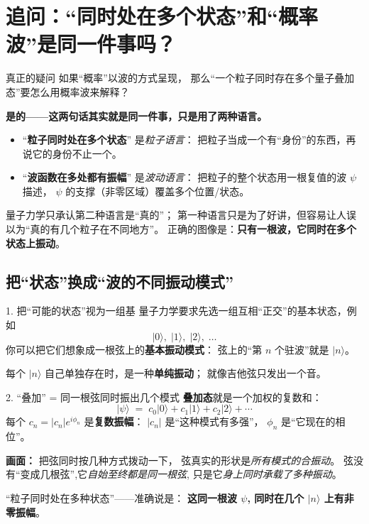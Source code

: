 \documentclass[11pt,a4paper]{ctexart}
\begin{document}
\section{追问：``同时处在多个状态''和``概率波''是同一件事吗？}

\begin{questionblock}{真正的疑问}
如果``概率''以波的方式呈现，
那么``一个粒子同时存在多个量子叠加态''要怎么用概率波来解释？
\end{questionblock}

\begin{answerblock}
\textbf{是的——这两句话其实就是同一件事，只是用了两种语言。}

\smallskip
\begin{itemize}
  \item ``\textbf{粒子同时处在多个状态}'' 是\emph{粒子语言}：
        把粒子当成一个有``身份''的东西，再说它的身份不止一个。
  \item ``\textbf{波函数在多处都有振幅}'' 是\emph{波动语言}：
        把粒子的整个状态用一根复值的波 $\psi$ 描述，
        $\psi$ 的支撑（非零区域）覆盖多个位置/状态。
\end{itemize}

\smallskip
量子力学只承认第二种语言是``真的''；
第一种语言只是为了好讲，但容易让人误以为``真的有几个粒子在不同地方''。
正确的图像是：\textbf{只有一根波，它同时在多个状态上振动}。
\end{answerblock}

\subsection{把``状态''换成``波的不同振动模式''}

\begin{stepblock}{1. 把``可能的状态''视为一组基}
量子力学要求先选一组互相``正交''的基本状态，例如
\[
  \lvert 0\rangle,\;\lvert 1\rangle,\;\lvert 2\rangle,\;\dots
\]
你可以把它们想象成一根弦上的\textbf{基本振动模式}：
弦上的``第 $n$ 个驻波''就是 $\lvert n\rangle$。
\smallskip

每个 $\lvert n\rangle$ 自己单独存在时，是一种\textbf{单纯振动}；
就像吉他弦只发出一个音。
\end{stepblock}

\begin{stepblock}{2. ``叠加'' = 同一根弦同时振出几个模式}
\textbf{叠加态}就是一个加权的复数和：
\[
  \lvert\psi\rangle
  \;=\; c_0\lvert 0\rangle + c_1\lvert 1\rangle + c_2\lvert 2\rangle + \cdots
\]
每个 $c_n = |c_n|e^{i\phi_n}$ 是\textbf{复数振幅}：
$|c_n|$ 是``这种模式有多强''，
$\phi_n$ 是``它现在的相位''。
\smallskip

\textbf{画面：} 把弦同时按几种方式拨动一下，
弦真实的形状是\emph{所有模式的合振动}。
弦没有``变成几根弦'',它\emph{自始至终都是同一根弦}, 只是它\emph{身上同时承载了多种振动}。

\smallskip
``粒子同时处在多种状态''——准确说是：
\textbf{这同一根波 $\psi$, 同时在几个 $\lvert n\rangle$ 上有非零振幅}。
\end{stepblock}
\end{document}
